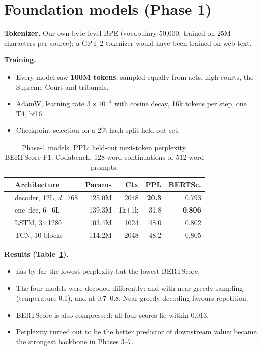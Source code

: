 \section{Foundation models (Phase 1)}\label{sec:p1}
\textbf{Tokenizer.} Our own byte-level BPE (vocabulary 50,000, trained on 25M characters per source); a GPT-2 tokenizer would have been trained on web text.

\textbf{Training.}
\begin{itemize}
\item Every model saw \textbf{100M tokens}, sampled equally from acts, high courts, the Supreme Court and tribunals.
\item AdamW, learning rate $3\!\times\!10^{-4}$ with cosine decay, 16k tokens per step, one T4, bf16.
\item Checkpoint selection on a 2\% hash-split held-out set.
\end{itemize}

\begin{table}[t]\centering\footnotesize\setlength{\tabcolsep}{3pt}
\begin{tabular}{@{}l l r r r r@{}}\toprule
 & Architecture & Params & Ctx & PPL & BERTSc. \\\midrule
\A & decoder, 12L, $d$=768 & 125.0M & 2048 & \textbf{20.3} & 0.793 \\
\B & enc--dec, 6+6L & 139.3M & 1k+1k & 31.8 & \textbf{0.806} \\
\C & LSTM, 3$\times$1280 & 103.4M & 1024 & 48.0 & 0.802 \\
\D & TCN, 10 blocks & 114.2M & 2048 & 48.2 & 0.805 \\\bottomrule
\end{tabular}
\caption{Phase-1 models. PPL: held-out next-token perplexity. BERTScore F1: Codabench, 128-word continuations of 512-word prompts.}\label{tab:p1}\vspace{-1em}
\end{table}

\textbf{Results (Table~\ref{tab:p1}).}
\begin{itemize}
\item \A{} has by far the lowest perplexity but the lowest BERTScore.
\item The four models were decoded differently: \A{} and \C{} with near-greedy sampling (temperature 0.1), \B{} and \D{} at 0.7--0.8. Near-greedy decoding favours repetition.
\item BERTScore is also compressed: all four scores lie within 0.013.
\item Perplexity turned out to be the better predictor of downstream value: \A{} became the strongest backbone in Phases 3--7.
\end{itemize}

